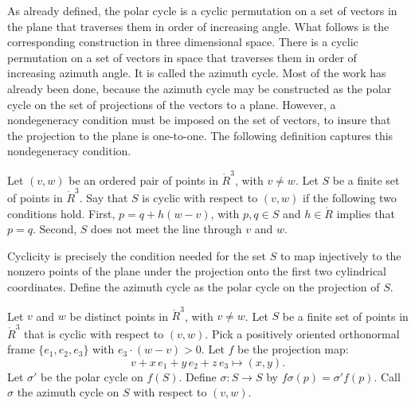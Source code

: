 As already defined, the polar cycle is a cyclic permutation on a set
of vectors in the plane that traverses them in order of increasing
angle.  What follows is the corresponding construction in three dimensional
space.  There is  a cyclic permutation on a set of vectors in space
that traverses them in order of increasing azimuth angle.  It is called 
the azimuth cycle.  Most of the work has already been done, because the azimuth cycle may be constructed as the polar cycle on the set of projections of the vectors to a plane.  However, 
a nondegeneracy condition must be imposed on the set of vectors, to insure that
the projection to the plane is one-to-one.  The following
definition captures this nondegeneracy condition.


\begin{definition} Let $(v,w)$ be an ordered pair of points in
$\ring{R}^3$, with $v\ne w$.
Let $S$ be a finite set of points in $\ring{R}^3$.
Say that $S$ is cyclic with respect to $(v,w)$ if
the following two conditions hold.
First, $p = q + h (w-v)$, with $p,q\in S$ and $h\in \ring{R}$
implies that $p=q$.  Second, $S$ does not meet the line
through $v$ and $w$.
\end{definition}

Cyclicity is precisely the condition needed for the
set $S$ to map injectively to the nonzero points of the 
plane under the projection
onto the first two cylindrical coordinates.   Define
the azimuth cycle as the polar cycle on the projection of $S$.

\begin{definition}
Let $v$ and $w$ be distinct points in
$\ring{R}^3$, with $v\ne w$.
Let $S$ be a finite set of points in $\ring{R}^3$ that is
cyclic  with respect to $(v,w)$.
Pick a positively oriented orthonormal frame $\{e_1,e_2,e_3\}$
with $e_3\cdot (w-v) > 0$.
Let $f$ be the projection map:
   $$v + x\, e_1 + y\, e_2 + z\, e_3 \mapsto
     (x,y).$$
Let $\sigma'$ be the polar cycle on $f(S)$. Define 
$\sigma:S\to S$ by $f\sigma(p) =\sigma'f(p)$.
Call $\sigma$ the azimuth cycle
on $S$ with respect to $(v,w)$.
\end{definition}


